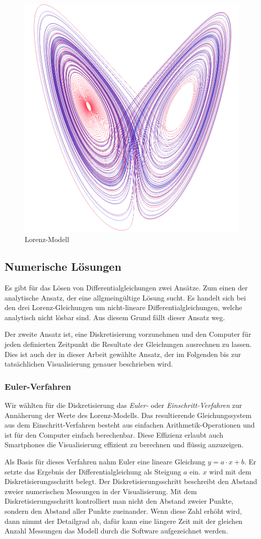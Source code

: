 \begin{figure}
	\centering
	\includegraphics[width=0.3\linewidth]{lorenz/assets/lorenz-modell/lorenz-modell}
	\caption{Lorenz-Modell}
	\label{fig:lorenz-modell}
\end{figure}


\subsection{Numerische Lösungen}
Es gibt für das Lösen von Differentialgleichungen zwei Ansätze. Zum einen der analytische Ansatz, der eine allgmeingültige Lösung sucht. Es handelt sich bei den drei Lorenz-Gleichungen um nicht-lineare Differentialgleichungen, welche analytisch nicht lösbar sind. Aus diesem Grund fällt dieser Ansatz weg. 

Der zweite Ansatz ist, eine Diskretisierung vorzunehmen und den Computer für jeden definierten Zeitpunkt die Resultate der Gleichungen ausrechnen zu lassen. Dies ist auch der in dieser Arbeit gewählte Ansatz, der im Folgenden bis zur tatsächlichen Visualisierung genauer beschrieben wird. 

\subsubsection{Euler-Verfahren}

Wir wählten für die Diskretisierung das \textit{Euler-} oder \textit{Einschritt-Verfahren} zur Annäherung der Werte des Lorenz-Modells. Das resultierende Gleichungssystem aus dem Einschritt-Verfahren besteht aus einfachen Arithmetik-Operationen und ist für den Computer einfach berechenbar. Diese Effizienz erlaubt auch Smartphones die Visualisierung effizient zu berechnen und flüssig anzuzeigen.

Als Basis für dieses Verfahren nahm Euler eine lineare Gleichung $ y = a \cdot x + b $. Er setzte das Ergebnis der Differentialgleichung als Steigung $ a $ ein. $x$ wird mit dem Diskretisierungsschritt belegt. Der Diskretisierungsschritt beschreibt den Abstand zweier numerischen Messungen in der Visualisierung. Mit dem Diskretisierungsschritt kontrolliert man nicht den Abstand zweier Punkte, sondern den Abstand aller Punkte zueinander. Wenn diese Zahl erhöht wird, dann nimmt der Detailgrad ab, dafür kann eine längere Zeit mit der gleichen Anzahl Messungen das Modell durch die Software aufgezeichnet werden.

